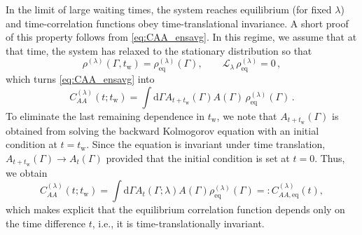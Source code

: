 In the limit of large waiting times, the system reaches equilibrium (for fixed $\lambda$) and time-correlation functions obey time-translational invariance. A short proof of this property follows from \cref{eq:CAA_ensavg}. In this regime, we assume that at that time, the system has relaxed to the stationary distribution so that
\begin{equation}
\rho^{(\lambda)}(\Gamma,t_\mathrm{w}) = \rho^{(\lambda)}_\mathrm{eq}(\Gamma),
\qquad
\mathcal L_\lambda\,\rho^{(\lambda)}_\mathrm{eq} = 0 \,,
\end{equation}
which turns \cref{eq:CAA_ensavg} into %
\begin{equation}
C_{AA}^{(\lambda)}(t;t_\mathrm{w})
= \int \mathrm d\Gamma A_{t+t_\mathrm{w}}(\Gamma) A(\Gamma) \,
\rho^{(\lambda)}_\mathrm{eq}(\Gamma) \,.
\end{equation}
To eliminate the last remaining dependence in $t_\mathrm{w}$, we note that $A_{t+t_\mathrm{w}}(\Gamma)$ is obtained from solving the backward Kolmogorov equation with an initial condition at $t =t_\mathrm{w}$. Since the equation is invariant under time translation, $A_{t+t_\mathrm{w}}(\Gamma) \to A_{t}(\Gamma)$ provided that the initial condition is set at $t = 0$. Thus, we obtain
\begin{equation}
C_{AA}^{(\lambda)}(t;t_\mathrm{w})
=  \int \mathrm{d} \Gamma A_{t}(\Gamma; \lambda) A(\Gamma) \rho_\mathrm{eq}^{(\lambda)}(\Gamma)
=: C_{AA,\mathrm{eq}}^{(\lambda)}(t), \label{eq:equilibrium_autocorr_ens}
\end{equation}
which makes explicit that the equilibrium correlation function depends only on the time difference $t$, i.e., it is time-translationally invariant.

